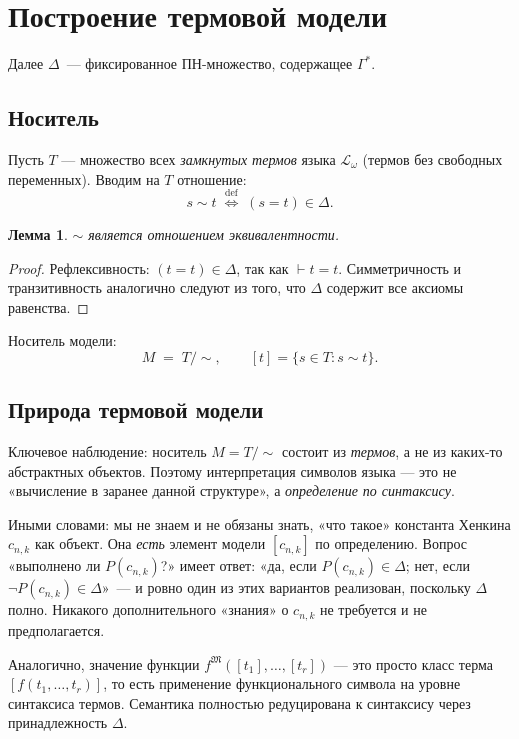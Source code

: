 \documentclass[12pt, a4paper]{article}
\theoremstyle{plain}
\newtheorem{lemma}[theorem]{Лемма}
\theoremstyle{definition}
\newcommand{\proves}{\vdash}
\newcommand{\Lw}{\mathcal{L}_\omega}
\newcommand{\Struct}{\mathfrak{M}}
\begin{document}
\section{Построение термовой модели}

Далее $\Delta$~--- фиксированное ПН-множество, содержащее $\Gamma^*$.

\subsection{Носитель}

Пусть $T$ — множество всех \emph{замкнутых термов} языка $\Lw$
(термов без свободных переменных). Вводим на $T$ отношение:
\[
  s \sim t \;\stackrel{\text{def}}{\iff}\; (s = t) \in \Delta.
\]

\begin{lemma}
$\sim$ является отношением эквивалентности.
\end{lemma}

\begin{proof}
Рефлексивность: $(t = t) \in \Delta$, так как $\proves t = t$.
Симметричность и транзитивность аналогично следуют из
того, что $\Delta$ содержит все аксиомы равенства.
\end{proof}

Носитель модели:
\[
  M \;=\; T/{\sim}, \qquad [t] = \{s \in T : s \sim t\}.
\]

\subsection{Природа термовой модели}

Ключевое наблюдение: носитель $M = T/{\sim}$ состоит из \emph{термов},
а не из каких-то абстрактных объектов. Поэтому интерпретация символов
языка — это не «вычисление в заранее данной структуре», а
\emph{определение по синтаксису}.

Иными словами: мы не знаем и не обязаны знать, «что такое» константа
Хенкина $c_{n,k}$ как объект. Она \emph{есть} элемент модели $[c_{n,k}]$
по определению. Вопрос «выполнено ли $P(c_{n,k})$?» имеет ответ:
«да, если $P(c_{n,k}) \in \Delta$; нет, если $\neg P(c_{n,k}) \in \Delta$»~---
и ровно один из этих вариантов реализован, поскольку $\Delta$ полно.
Никакого дополнительного «знания» о $c_{n,k}$ не требуется и не предполагается.

Аналогично, значение функции $f^{\Struct}([t_1],\ldots,[t_r])$ — это просто
класс терма $[f(t_1,\ldots,t_r)]$, то есть применение функционального символа
на уровне синтаксиса термов. Семантика полностью редуцирована к синтаксису
через принадлежность $\Delta$.
\end{document}
